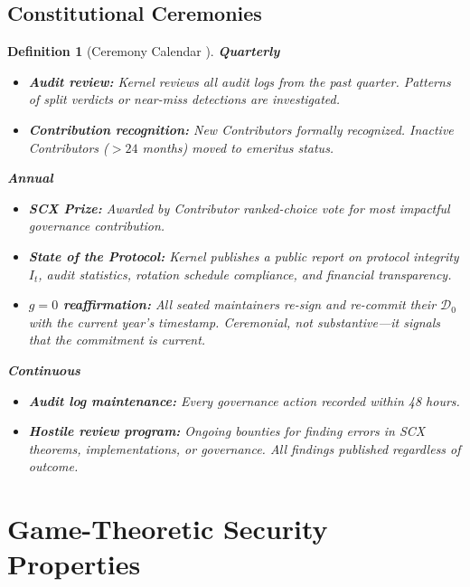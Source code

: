 \documentclass[12pt,a4paper]{article}
\newtheorem{definition}[theorem]{Definition}
\theoremstyle{definition}
\newcommand{\gzero}{g=0}
\newcommand{\GzeroDecl}{\mathcal{D}_{0}}
\begin{document}
\subsection{Constitutional Ceremonies}
\begin{definition}[Ceremony Calendar ]
\label{def:ceremonies}
\noindent\textbf{Quarterly}
\begin{itemize}
    \item \textbf{Audit review:} Kernel reviews all audit logs from the past quarter. Patterns of split verdicts or near-miss detections are investigated.
    \item \textbf{Contribution recognition:} New Contributors formally recognized. Inactive Contributors ($> 24$ months) moved to emeritus status.
\end{itemize}
\noindent\textbf{Annual}
\begin{itemize}
    \item \textbf{SCX Prize:} Awarded by Contributor ranked-choice vote for most impactful governance contribution.
    \item \textbf{State of the Protocol:} Kernel publishes a public report on protocol integrity $I_t$, audit statistics, rotation schedule compliance, and financial transparency.
    \item \textbf{$\gzero$ reaffirmation:} All seated maintainers re-sign and re-commit their $\GzeroDecl$ with the current year's timestamp. Ceremonial, not substantive---it signals that the commitment is current.
\end{itemize}
\noindent\textbf{Continuous}
\begin{itemize}
    \item \textbf{Audit log maintenance:} Every governance action recorded within 48 hours.
    \item \textbf{Hostile review program:} Ongoing bounties for finding errors in SCX theorems, implementations, or governance. All findings published regardless of outcome.
\end{itemize}
\end{definition}
\section{Game-Theoretic Security Properties}
\label{sec:security}
\end{document}
